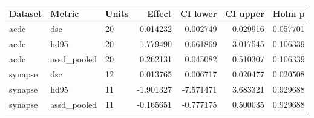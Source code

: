 \begin{tabular}{lllrrrr}
Dataset & Metric & Units & Effect & CI lower & CI upper & Holm p \\
\hline
acdc & dsc & 20 & 0.014232 & 0.002749 & 0.029916 & 0.057701 \\
acdc & hd95 & 20 & 1.779490 & 0.661869 & 3.017545 & 0.106339 \\
acdc & assd\_pooled & 20 & 0.262131 & 0.045082 & 0.510307 & 0.106339 \\
synapse & dsc & 12 & 0.013765 & 0.006717 & 0.020477 & 0.020508 \\
synapse & hd95 & 11 & -1.901327 & -7.571471 & 3.683321 & 0.929688 \\
synapse & assd\_pooled & 11 & -0.165651 & -0.777175 & 0.500035 & 0.929688 \\
\end{tabular}
